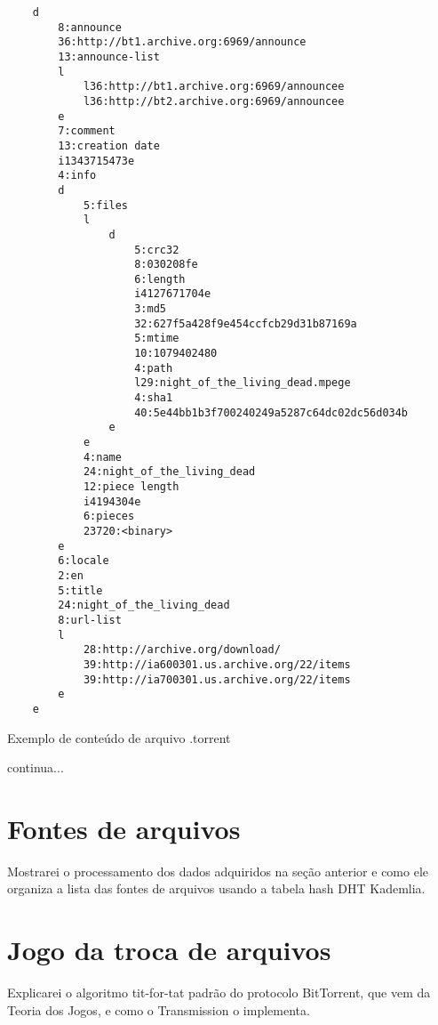 \begin{listing}[!h]
    \begin{verbatim}
    d
        8:announce
        36:http://bt1.archive.org:6969/announce
        13:announce-list
        l
            l36:http://bt1.archive.org:6969/announcee
            l36:http://bt2.archive.org:6969/announcee
        e
        7:comment
        13:creation date
        i1343715473e
        4:info
        d
            5:files
            l
                d
                    5:crc32
                    8:030208fe
                    6:length
                    i4127671704e
                    3:md5
                    32:627f5a428f9e454ccfcb29d31b87169a
                    5:mtime
                    10:1079402480
                    4:path
                    l29:night_of_the_living_dead.mpege
                    4:sha1
                    40:5e44bb1b3f700240249a5287c64dc02dc56d034b
                e
            e
            4:name
            24:night_of_the_living_dead
            12:piece length
            i4194304e
            6:pieces
            23720:<binary>
        e
        6:locale
        2:en
        5:title
        24:night_of_the_living_dead
        8:url-list
        l
            28:http://archive.org/download/
            39:http://ia600301.us.archive.org/22/items
            39:http://ia700301.us.archive.org/22/items
        e
    e
    \end{verbatim}
    \caption{Exemplo de conteúdo de arquivo .torrent}
    \label{code:torrent-file}
\end{listing}

continua...


\section{Fontes de arquivos}

Mostrarei o processamento dos dados adquiridos na seção anterior e como ele organiza a lista das fontes de arquivos usando a tabela hash DHT Kademlia.

\section{Jogo da troca de arquivos}

Explicarei o algoritmo tit-for-tat padrão do protocolo BitTorrent, que vem da Teoria dos Jogos, e como o Transmission o implementa.

\afterpage{\clearpage}